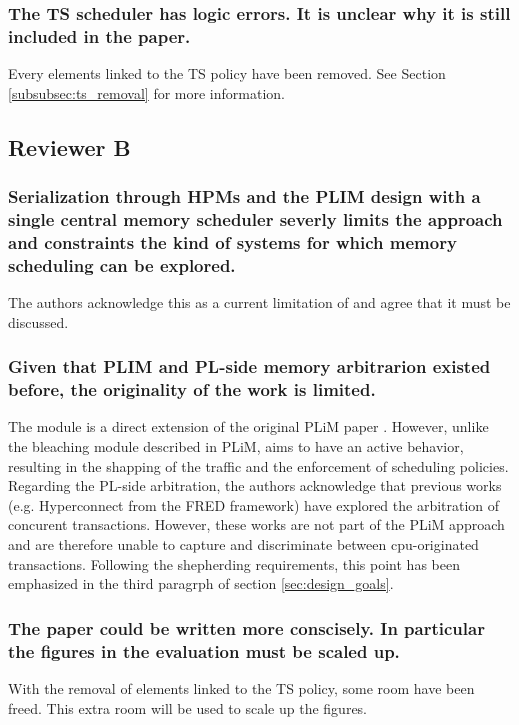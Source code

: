         \subsubsection{The TS scheduler has logic errors. It is unclear why it is still included in the paper.}
            Every elements linked to the TS policy have been removed. See Section \ref{subsubsec:ts_removal} for more information.

    \subsection{Reviewer B}
        \subsubsection{Serialization through HPMs and the PLIM design with a single central memory scheduler severly limits the approach and constraints the kind of systems for which memory scheduling can be explored.}
            The authors acknowledge this as a current limitation of \schim and agree that it must be discussed.

        \subsubsection{Given that PLIM and PL-side memory arbitrarion existed before, the originality of the work is limited.}
            The \schim module is a direct extension of the original PLiM paper \cite{PLIM20}. However, unlike the bleaching module described in PLiM, \schim aims to have an active behavior, resulting in the shapping of the traffic and the enforcement of scheduling policies.
            Regarding the PL-side arbitration, the authors acknowledge that previous works (e.g. Hyperconnect from the FRED framework) have explored the arbitration of concurent transactions. However, these works are not part of the PLiM approach and are therefore unable to capture and discriminate between cpu-originated transactions.
            Following the shepherding requirements, this point has been emphasized in the third paragrph of section \ref{sec:design_goals}.



        \subsubsection{The paper could be written more conscisely. In particular the figures in the evaluation must be scaled up.}
            With the removal of elements linked to the TS policy, some room have been freed. This extra room will be used to scale up the figures.

